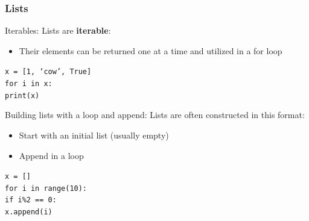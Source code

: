 \documentclass{beamer}
\newcommand{\code}[1]{\texttt{#1}}
\newcommand{\tab}{\hspace*{22pt}}
\begin{document}
\begin{frame}%
	\frametitle{Lists}

		\begin{block}{Iterables:}
			Lists are \textbf{iterable}:
			\begin{itemize}
				\item Their elements can be returned one at a time and utilized in a for loop
			\end{itemize}
			
			\vspace{10pt}
			\code{x = [1, `cow', True] \\
			for i in x: \\
			\tab print(x)
			}
		\end{block}	
	\endminipage\hfill
	\endminipage\hfill	
		\begin{block}{Building lists with a loop and append:}
			Lists are often constructed in this format:
			\begin{itemize}
				\item Start with an initial list (usually empty)
				\item Append in a loop
			\end{itemize}
			
			\vspace{10pt}
			\code{x = [] \\
			for i in range(10): \\
			\tab if i\%2 == 0: \\
			\tab \tab x.append(i)
			}
		\end{block}
	\endminipage\hfill
	
\end{frame}
\end{document}
